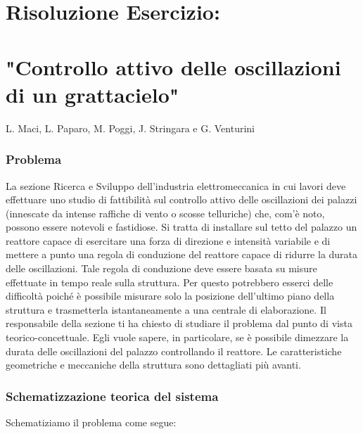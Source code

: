 \documentclass[a4paper]{report}
\begin{document}
\begin{center}
  \section*{Risoluzione Esercizio:}
  \section*{"Controllo attivo delle oscillazioni di un grattacielo"}
  L. Maci, L. Paparo, M. Poggi, J. Stringara e G. Venturini
\end{center}

\subsubsection{Problema}
La sezione Ricerca e Sviluppo dell’industria elettromeccanica in cui lavori deve effettuare uno studio di fattibilità sul controllo attivo delle oscillazioni dei palazzi (innescate da intense raffiche di vento o scosse telluriche) che, com’è noto, possono essere notevoli e fastidiose. Si tratta di installare sul tetto del palazzo un reattore capace di esercitare una forza di direzione e intensità variabile e di mettere a punto una regola di conduzione del reattore capace di ridurre la durata delle oscillazioni. Tale regola di conduzione deve essere basata su misure effettuate in tempo reale sulla struttura. Per questo potrebbero esserci delle difficoltà poiché è possibile misurare solo la posizione dell’ultimo piano della struttura e trasmetterla istantaneamente a una centrale di elaborazione. Il responsabile della sezione ti ha chiesto di studiare il problema dal punto di vista teorico-concettuale. Egli vuole sapere, in particolare, se è possibile dimezzare la durata delle oscillazioni del palazzo controllando il reattore. Le caratteristiche geometriche e meccaniche della struttura sono dettagliati più avanti.


\subsubsection{Schematizzazione teorica del sistema}
Schematiziamo il problema come segue:
\end{document}
